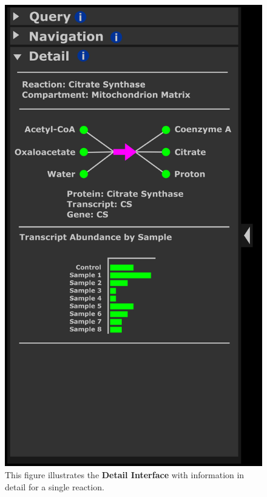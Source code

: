 \begin{figure}[htbp]
\includegraphics[scale=1]{sketch_2017-01-02_6}
\centering
\caption{This figure illustrates the \textbf{Detail Interface} with information in detail for a single reaction.}
\label{fig:2017-01-02_6}
\end{figure}

